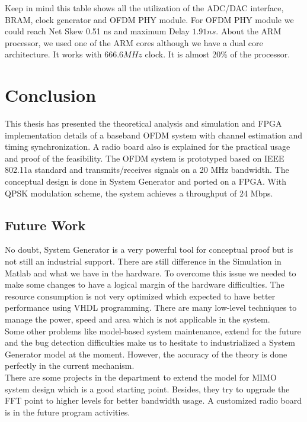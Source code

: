Keep in mind this table shows all the utilization of the ADC/DAC interface, BRAM, clock generator and OFDM PHY module. For OFDM PHY module we could reach Net Skew 0.51 ns and maximum  Delay $1.91 ns$. About the ARM processor, we used one of the ARM cores although we have a dual core architecture. It works with $666.6 MHz$ clock. It is almost 20\% of the processor.\\

\section{Conclusion}

This thesis has presented the theoretical analysis and simulation and  FPGA implementation details of a baseband OFDM system with channel estimation and timing synchronization. A radio board also is explained for the practical usage and proof of the feasibility. The OFDM system is prototyped based on IEEE 802.11a standard and transmits/receives signals on a 20 MHz bandwidth. The conceptual design is done in System Generator and ported on a FPGA. With QPSK modulation scheme, the system achieves a throughput of 24 Mbps.\\

\subsection{Future Work}
No doubt, System Generator is a very powerful tool for conceptual proof but is not still an industrial support. There are still difference in the Simulation in Matlab and what we have in the hardware. To overcome this issue we needed to make some changes to have a logical margin of the hardware difficulties. The resource consumption is not very optimized which expected to have better performance using VHDL programming. There are many low-level techniques to manage the power, speed and area which is not applicable in the system.\\
Some other problems like model-based system maintenance, extend for the future and the bug detection difficulties make us to hesitate to industrialized a System Generator model at the moment. However, the accuracy of the theory is done perfectly in the current mechanism.\\
There are some projects in the department to extend the model for MIMO system design which is a good starting point. Besides, they try to upgrade the FFT point to higher levels for better bandwidth usage. A customized radio board is in the future program activities.\\